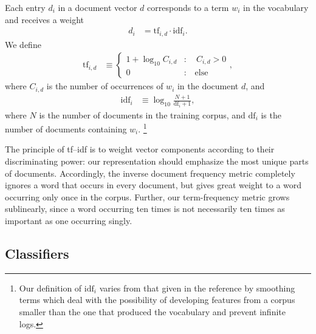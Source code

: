 \documentclass{article}
\begin{document}
Each entry $d_i$ in a document vector $d$ corresponds to a term $w_i$ in the vocabulary and receives a weight
%
\begin{align}
  d_i &= \mathrm{tf}_{i,d} \cdot \mathrm{idf}_{i}.
\end{align}
%
We define
%
\begin{align}
  \mathrm{tf}_{i,d} &\equiv \begin{cases}
                         1 + \log_{10}C_{i,d} &:\quad C_{i,d} > 0\\
                         0 &:\quad\text{else}
                       \end{cases},
\end{align}
%
where $C_{i,d}$ is the number of occurrences of $w_i$ in the document $d$, and
%
\begin{align}
  \mathrm{idf}_i &\equiv \log_{10} \frac{N+1}{\mathrm{df}_i + 1},
\end{align}
%
where $N$ is the number of documents in the training corpus, and $\mathrm{df}_i$ is the number of documents containing $w_i$.
%
\footnote{Our definition of $\mathrm{idf}_i$ varies from that given in the reference by smoothing terms which deal with the possibility of developing features from a corpus smaller than the one that produced the vocabulary and prevent infinite logs.}

The principle of tf--idf is to weight vector components according to their discriminating power: our representation should emphasize the most unique parts of documents.
Accordingly, the inverse document frequency metric completely ignores a word that occurs in every document, but gives great weight to a word occurring only once in the corpus.
Further, our term-frequency metric grows sublinearly, since a word occurring ten times is not necessarily ten times as important as one occurring singly.











\subsection{Classifiers} \label{sec:classifiers}
\end{document}
